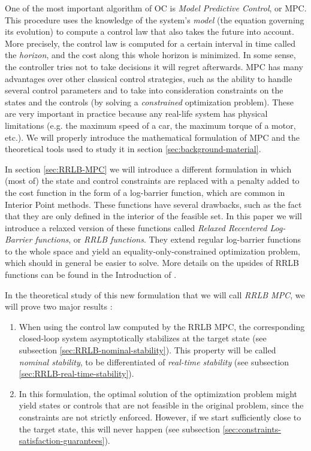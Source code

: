 \documentclass[12pt]{article}
\begin{document}
One of the most important algorithm of OC is \textit{Model Predictive Control}, or MPC.
This procedure uses the knowledge of the system's \textit{model} (the equation governing its evolution) to compute a control law that also takes the future into account.
More precisely, the control law is computed for a certain interval in time called the \textit{horizon}, and the cost along this whole horizon is minimized.
In some sense, the controller tries not to take decisions it will regret afterwards.
MPC has many advantages over other classical control strategies, such as the ability to handle several control parameters and to take into consideration constraints on the states and the controls (by solving a \textit{constrained} optimization problem).
These are very important in practice because any real-life system has physical limitations (e.g. the maximum speed of a car, the maximum torque of a motor, etc.).
We will properly introduce the mathematical formulation of MPC and the theoretical tools used to study it in section \ref{sec:background-material}.

In section \ref{sec:RRLB-MPC} we will introduce a different formulation in which (most of) the state and control constraints are replaced with a penalty added to the cost function in the form of a log-barrier function, which are common in Interior Point methods.
These functions have several drawbacks, such as the fact that they are only defined in the interior of the feasible set.
In this paper we will introduce a relaxed version of these functions called \textit{Relaxed Recentered Log-Barrier functions}, or \textit{RRLB functions}.
They extend regular log-barrier functions to the whole space and yield an equality-only-constrained optimization problem, which should in general be easier to solve.
More details on the upsides of RRLB functions can be found in the Introduction of \cite{RRLB-linear-MPC}.

In the theoretical study of this new formulation that we will call \textit{RRLB MPC}, we will prove two major results :

\begin{enumerate}
	\item When using the control law computed by the RRLB MPC, the corresponding closed-loop system asymptotically stabilizes at the target state (see subsection \ref{sec:RRLB-nominal-stability}).
	This property will be called \textit{nominal stability}, to be differentiated of \textit{real-time stability} (see subsection \ref{sec:RRLB-real-time-stability}).
	\item In this formulation, the optimal solution of the optimization problem might yield states or controls that are not feasible in the original problem, since the constraints are not strictly enforced.
	However, if we start sufficiently close to the target state, this will never happen (see subsection \ref{sec:constraints-satisfaction-guarantees}).
\end{enumerate}
\end{document}
